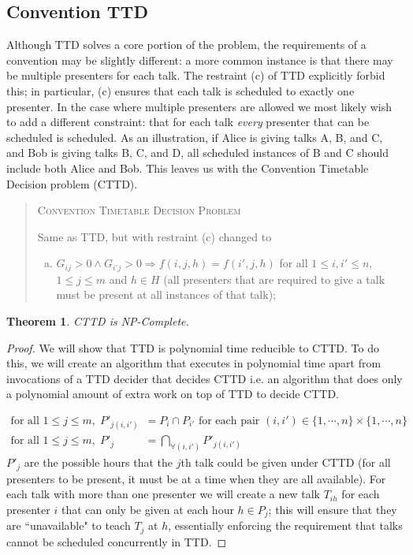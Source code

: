 \documentclass[]{article}
\newtheorem{thm}{Theorem}[section]
\theoremstyle{definition}
\theoremstyle{remark}
\numberwithin{equation}{section}
\begin{document}
\subsection{Convention TTD}
Although TTD solves a core portion of the problem, the requirements of a convention may be slightly different: a more common instance is that there may be multiple presenters for each talk. The restraint (c) of TTD explicitly forbid this; in particular, (c) ensures that each talk is scheduled to exactly one presenter. In the case where multiple presenters are allowed we most likely wish to add a different constraint: that for each talk \emph{every} presenter that can be scheduled is scheduled. As an illustration, if Alice is giving talks A, B, and C, and Bob is giving talks B, C, and D, all scheduled instances of B and C should include both Alice and Bob. This leaves us with the Convention Timetable Decision problem (CTTD).
\begin{quote}
	\textsc{Convention Timetable Decision Problem}
	
	Same as TTD, but with restraint (c) changed to
	\begin{enumerate}[(c)]
		\item $G_{ij} > 0 \land G_{i'j} > 0 \Rightarrow f(i,j,h)=f(i',j,h)$ for all $1 \le i,i' \le n$, $1 \le j \le m$ and $h \in H$ (all presenters that are required to give a talk must be present at all instances of that talk);
	\end{enumerate}
\end{quote}
\begin{thm}
CTTD is NP-Complete.
\end{thm}
\begin{proof}
We will show that TTD is polynomial time reducible to CTTD. To do this, we will create an algorithm that executes in polynomial time apart from invocations of a TTD decider that decides CTTD i.e. an algorithm that does only a polynomial amount of extra work on top of TTD to decide CTTD.

\begin{align*}
\text{for all } 1 \le j \le m,\; P'_{j(i,i')} &= P_i \cap P_{i'} \text{ for each pair } (i,i') \in \{1,\cdots,n\} \times \{1,\cdots,n\}  \\
\text{for all } 1 \le j \le m,\; P'_j &= \bigcap\limits_{\forall (i,i')} P'_{j(i,i')}
\end{align*}
$P'_j$ are the possible hours that the $j$th talk could be given under CTTD (for all presenters to be present, it must be at a time when they are all available). For each talk with more than one presenter we will create a new talk $T_{ih}$ for each presenter $i$ that can only be given at each hour $h \in P_j$; this will ensure that they are ``unavailable" to teach $T_j$ at $h$, essentially enforcing the requirement that talks cannot be scheduled concurrently in TTD.
\end{proof}
\end{document}
